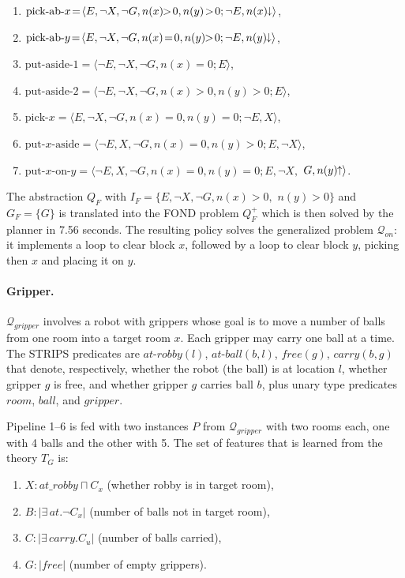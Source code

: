 \documentclass[letterpaper]{article} %
\newcommand{\tup}[1]{\langle #1 \rangle}
\newcommand{\abs}[1]{\ensuremath{\left\vert{#1}\right\vert}}
\newcommand{\Q}{\mathcal{Q}}
\newcommand{\abst}[2]{\tup{#1;#2}}
\newcommand{\pplus}{\hspace{-.05em}\raisebox{.15ex}{\footnotesize$\uparrow$}}
\newcommand{\mminus}{\hspace{-.05em}\raisebox{.15ex}{\footnotesize$\downarrow$}}
\begin{document}
\begin{enumerate}[--]
  \item $\text{pick-ab-$x$}\!=\!\abst{E,\neg X,\neg G,n(x)\!\!>\!0,n(y)\!>\!0}{\neg E,n(x)\mminus}$,
  \item $\text{pick-ab-$y$}\!=\!\abst{E,\neg X,\neg G,n(x)\!=\!0,n(y)\!\!>\!0}{\neg E,n(y)\mminus}$,
  \item $\text{put-aside-1}=\abst{\neg E,\neg X,\neg G,n(x)=0}{E}$,
  \item $\text{put-aside-2}=\abst{\neg E,\neg X,\neg G,n(x)>0,n(y)>0}{E}$,
  \item $\text{pick-$x$}=\abst{E,\neg X,\neg G,n(x)=0,n(y)=0}{\neg E,X}$,
  \item $\text{put-$x$-aside}\!=\!\abst{\neg E,X,\neg G,n(x)=0,n(y)>0}{E,\neg X}$,
  \item $\text{put-$x$-on-$y$} = \langle \neg E, X, \neg G, n(x)=0, n(y)=0; E, \neg X,$ $G, n(y)\pplus \rangle$.
\end{enumerate}

The abstraction $Q_F$  with $I_F=\{E,\neg X,\neg G,n(x)>0,$ $n(y)\!>\!0\}$
and $G_F = \{G\}$ is translated into the FOND problem $Q_F^+$
which is then solved by the planner in 7.56 seconds.
The resulting policy solves the generalized problem $\Q_{on}$:
it implements a loop to clear block $x$, followed by a loop
to clear block $y$, picking then $x$ and placing it on $y$. 


\paragraph{Gripper.}
$\Q_{gripper}$ involves  a robot with grippers whose goal
is to move a number of balls from one room into a target
room $x$. Each gripper may carry one ball at a time.
The STRIPS predicates are $at\text{-}robby(l)$, $at\text{-}ball(b,l)$,
$free(g)$, $carry(b,g)$ that denote, respectively, whether the robot
(the ball) is at location $l$, whether gripper $g$ is free, and whether
gripper $g$ carries ball $b$, plus unary type predicates $room$, $ball$,
and $gripper$. %

Pipeline 1--6 is fed with two instances $P$ from $\Q_{gripper}$  with two
rooms each, one with 4 balls and the other with 5. The set of features that
is learned  from the theory $T_G$ is:
\begin{enumerate}[--]
  \item $X: at\_robby \sqcap C_x$ (whether robby is in target room),
  \item $B: |\exists\,at . \neg C_x|$ (number of balls not in target room),
  \item $C: |\exists\,carry . C_u|$ (number of balls carried),
  \item $G: \abs{free}$ (number of empty grippers).
\end{enumerate}
\end{document}
